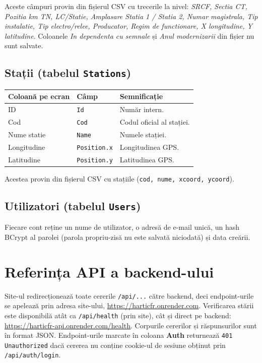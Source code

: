 \documentclass[11pt,a4paper]{article}
\newcommand{\code}[1]{\texttt{#1}}
\begin{document}
Aceste câmpuri provin din fișierul CSV cu trecerile la nivel: \emph{SRCF, Sectia CT, Pozitia km TN, LC/Statie,
Amplasare Statia 1 / Statia 2, Numar magistrala, Tip instalatie, Tip
electro/relee, Producator, Regim de functionare, X longitudine, Y
latitudine}. Coloanele \emph{In dependenta cu semnale} și \emph{Anul
modernizarii} din fișier nu sunt salvate.

\subsection{Stații (tabelul \code{Stations})}

\begin{center}
\begin{tabularx}{\textwidth}{@{}llX@{}}
\toprule
\textbf{Coloană pe ecran} & \textbf{Câmp} & \textbf{Semnificație} \\
\midrule
ID          & \code{Id}         & Număr intern. \\
Cod         & \code{Cod}        & Codul oficial al stației. \\
Nume statie & \code{Name}       & Numele stației. \\
Longitudine & \code{Position.x} & Longitudinea GPS. \\
Latitudine  & \code{Position.y} & Latitudinea GPS. \\
\bottomrule
\end{tabularx}
\end{center}

Acestea provin din fișierul CSV cu stațiile
(\code{cod, nume, xcoord, ycoord}).

\subsection{Utilizatori (tabelul \code{Users})}

Fiecare cont reține un nume de utilizator, o adresă de e-mail unică, un hash
BCrypt al parolei (parola propriu-zisă nu este salvată niciodată) și data
creării.

\section{Referința API a backend-ului}

Site-ul redirecționează toate cererile \code{/api/...} către backend, deci
endpoint-urile se apelează prin adresa site-ului,
\url{https://harticfr.onrender.com}. Verificarea stării este disponibilă
atât ca \code{/api/health} (prin site), cât și direct pe backend:
\url{https://harticfr-api.onrender.com/health}. Corpurile cererilor și răspunsurilor
sunt în format JSON. Endpoint-urile marcate în coloana \textbf{Auth}
returnează \code{401 Unauthorized} dacă cererea nu conține cookie-ul de
sesiune obținut prin \code{/api/auth/login}.
\end{document}
